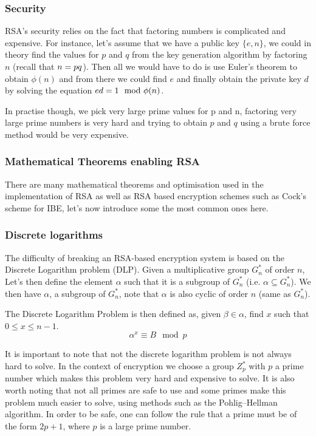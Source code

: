 \documentclass[conference]{IEEEtran}
\begin{document}
\subsubsection{Security}
RSA's security relies on the fact that factoring numbers is complicated and expensive.
For instance, let's assume that we have a public key $\{e,n\}$, we could in theory find
the values for $p$ and $q$ from the key generation algorithm by factoring $n$ (recall that $n = p\*q$). Then all we would have to do is 
use Euler's theorem to obtain $\phi(n)$ and from there we could find $e$ and finally 
obtain the private key $d$ by solving the equation $e\*d = 1\mod \phi(n)$.

In practise though, we pick very large prime values for p and n, factoring very large prime
numbers is very hard and trying to obtain $p$ and $q$ using a brute force method
would be very expensive.


\subsubsection{Mathematical Theorems enabling RSA}
There are many mathematical theorems and optimisation
used in the implementation of RSA as well as RSA based encryption schemes such as 
Cock's scheme for IBE, let's now introduce some
the most common ones here.


\subsubsection*{Discrete logarithms}
The difficulty of breaking an RSA-based encryption system is based on the 
Discrete Logarithm problem (DLP). 
Given a multiplicative group $G_{n}^{*}$ of order $n$,
Let's then define the element $\alpha$ such that it is a subgroup of $G_{n}^{*}$ 
(i.e. $\alpha \subseteq G_{n}^{*}$). We then have $\alpha$, a subgroup of $G_{n}^{*}$,
note that $\alpha$ is also cyclic of order $n$ (same as $G_{n}^{*}$).


The Discrete Logarithm Problem is then defined as, given $\beta \in \alpha$,
find $x$ such that $0 \leq x \leq n - 1$.
\begin{equation}
    \alpha^{x} \equiv B\mod p
\end{equation}

It is important to note that not the discrete logarithm problem
is not always hard to solve. In the context of encryption we choose a group
$Z_{p}^*$ with $p$ a prime number which makes this problem very hard and 
expensive to solve.
It is also worth noting that not all primes are safe to use and some primes
make this problem much easier to solve, using methods such as the 
Pohlig–Hellman algorithm. In order to be safe, one can follow the rule
that a prime must be of the form $2p + 1$, where $p$ is a large prime number. 
\end{document}
